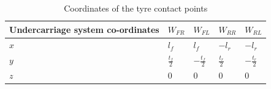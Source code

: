 \begin{table}[ht]
  \caption{Coordinates of the tyre contact points} %
  \centering %
  \begin{tabular}{l l l l l} %
    \hline\hline %
    Undercarriage system co-ordinates & $W_{FR}$ & $W_{FL}$ & $W_{RR}$ & $W_{RL}$ \\ [0.5ex] %
    \hline %
    $ x$ & $ l_f$ & $ l_f$ & $-l_r $ & $-l_r $\\ %
    $ y$ & $ \frac{t_f}{2} $ & $ -\frac{t_f}{2}$ & $ \frac{t_r}{2}$ & $ -\frac{t_r}{2}$\\ %
    $ z$ & $ 0 $& $ 0 $ & $ 0$ & $ 0$ \\ [1ex] %
    \hline %
  \end{tabular}
  \label{table:contactpoints} %
\end{table}
